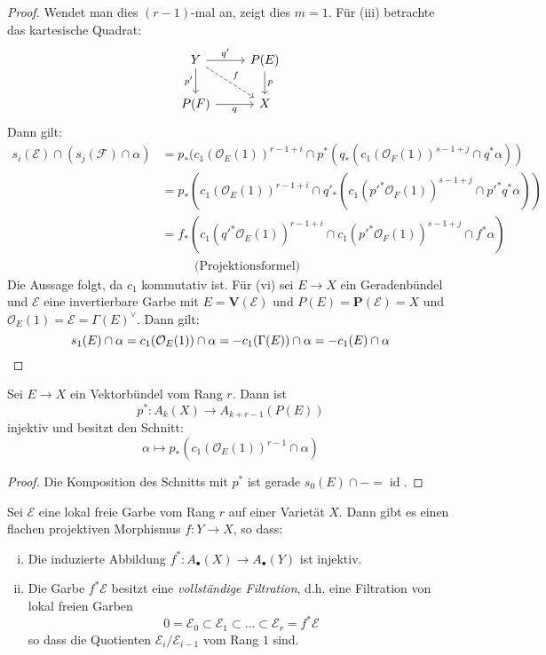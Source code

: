 \documentclass[10pt,b5paper]{article}
\begin{document}
\begin{proof}
Wendet man dies $(r-1)$-mal an, zeigt dies $m=1$. Für (iii) betrachte das kartesische Quadrat:
\[ \begin{tikzcd}
Y \rar["q'"]\dar["p'"']\ar[rd, "f", dashed] & P(E) \dar["p"]\\
P(F)\rar["q"'] & X
\end{tikzcd} \]
Dann gilt:
\begin{align*}
s_i(\mathcal{E})\cap (s_j(\mathcal{F})\cap \alpha) &= p_\ast (c_1(\mathcal{O}_E(1))^{r-1+i} \cap p^\ast(q_\ast(c_1(\mathcal{O}_F(1))^{s-1+j}\cap q^\ast \alpha))\\
&= p_\ast(c_1(\mathcal{O}_E(1))^{r-1+i}\cap q'_\ast(c_1(p'^\ast\mathcal{O}_F (1))^{s-1+j}\cap p'^\ast q^\ast\alpha))\\
&= f_\ast(c_1(q'^\ast\mathcal{O}_E(1))^{r-1+i}\cap c_1(p'^\ast\mathcal{O}_F (1))^{s-1+j}\cap f^\ast\alpha)\\
&\phantom{==} \text{(Projektionsformel)}
\end{align*}
Die Aussage folgt, da $c_1$ kommutativ ist. Für (vi) sei $E\to X$ ein Geradenbündel und $\mathcal{E}$ eine invertierbare Garbe mit $E=\mathbf{V}(\mathcal{E})$ und $P(E)=\mathbf{P}(\mathcal{E})=X$ und $\mathcal{O}_E(1)=\mathcal{E} = \Gamma(E)^\vee$. Dann gilt:
\[ s_1(E)\cap \alpha = c_1(\mathcal{O}_E(1))\cap\alpha = -c_1(\Gamma(E))\cap\alpha = -c_1(E)\cap\alpha\qedhere \]
\end{proof}

\begin{corollary}
Sei $E\to X$ ein Vektorbündel vom Rang $r$. Dann ist
\[ p^\ast: A_k(X)\to A_{k+r-1}(P(E)) \]
injektiv und besitzt den Schnitt:
\[ \alpha\mapsto p_\ast(c_1(\mathcal{O}_E(1))^{r-1}\cap\alpha) \]
\end{corollary}

\begin{proof}
Die Komposition des Schnitts mit $p^\ast$ ist gerade $s_0(E)\cap - = \operatorname{id}$.
\end{proof}

\begin{corollary}
Sei $\mathcal{E}$ eine lokal freie Garbe vom Rang $r$ auf einer Varietät $X$. Dann gibt es einen flachen projektiven Morphismus $f:Y\to X$, so dass:
\begin{enumerate}[(i)]
\item Die induzierte Abbildung $f^\ast:A_\bullet(X)\to A_\bullet(Y)$ ist injektiv.
\item Die Garbe $f^\ast\mathcal{E}$ besitzt eine \textit{vollständige Filtration}, d.h. eine Filtration von lokal freien Garben
\[ 0 = \mathcal{E}_0 \subset \mathcal{E}_1 \subset\ldots\subset \mathcal{E}_r = f^\ast\mathcal{E} \]
so dass die Quotienten $\mathcal{E}_i/\mathcal{E}_{i-1}$ vom Rang $1$ sind.
\end{enumerate}
\end{corollary}
\end{document}
